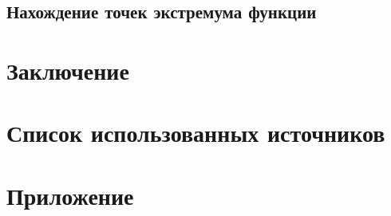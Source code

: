 \documentclass[oneside,final,14pt]{extarticle} %
\begin{document}
\subsection{Нахождение точек экстремума функции}

\newpage

\section*{Заключение}

\newpage


\section*{Список использованных источников}
\setlength{\parindent}{0cm}

\newpage

\section*{Приложение}
\setlength{\parindent}{0cm}

\newpage

\appendix
\end{document}
